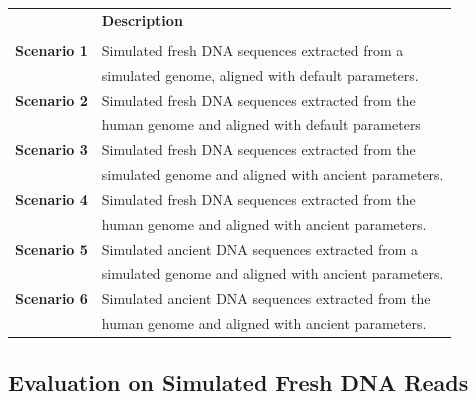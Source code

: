 \documentclass[11pt,a4paper]{report}
\begin{document}
\begin{table}[H]
  \begin{tabular}{ | c| p{9cm}  |}
    \hline
 		                           &  \textbf{Description} \\
 		                           &						\\ \hline
       \textbf{  Scenario 1 }  &  Simulated fresh DNA sequences extracted from a  \\
                               &  simulated genome, aligned with default parameters. \\ \hline
       \textbf{  Scenario 2 }  &  Simulated fresh DNA sequences extracted from the \\
                               &  human genome and aligned with default parameters \\  \hline
 	   \textbf{  Scenario 3 }  &  Simulated fresh DNA sequences extracted from the  \\
                               &  simulated genome and aligned with ancient parameters. \\  \hline
       \textbf{  Scenario 4 }  &  Simulated fresh DNA sequences extracted from the  \\
                               &  human genome and aligned with ancient parameters. \\  \hline
       \textbf{  Scenario 5 }  &  Simulated ancient DNA sequences extracted from a  \\
                               &  simulated genome and aligned with ancient parameters. \\  \hline
       \textbf{  Scenario 6 }  &  Simulated ancient DNA sequences extracted from the  \\
                               &  human genome and aligned with ancient parameters. \\  \hline
       
       
    \end{tabular}
\label{test-scenarios}
\end{table}




\subsection{Evaluation on Simulated Fresh DNA Reads } \label{Simulated Fresh DNA Reads }
 
\end{document}

